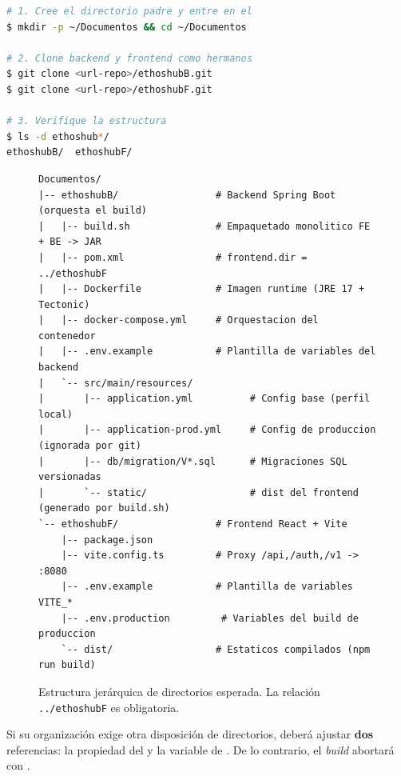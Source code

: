 \begin{lstlisting}[language=bash]
# 1. Cree el directorio padre y entre en el
$ mkdir -p ~/Documentos && cd ~/Documentos

# 2. Clone backend y frontend como hermanos
$ git clone <url-repo>/ethoshubB.git
$ git clone <url-repo>/ethoshubF.git

# 3. Verifique la estructura
$ ls -d ethoshub*/
ethoshubB/  ethoshubF/
\end{lstlisting}

\vspace{0.2cm}
\begin{figure}[h!]
\centering
\begin{lstlisting}[basicstyle=\ttfamily\scriptsize,numbers=none,frame=single,backgroundcolor=\color{grisTecnico}]
Documentos/
|-- ethoshubB/                 # Backend Spring Boot (orquesta el build)
|   |-- build.sh               # Empaquetado monolitico FE + BE -> JAR
|   |-- pom.xml                # frontend.dir = ../ethoshubF
|   |-- Dockerfile             # Imagen runtime (JRE 17 + Tectonic)
|   |-- docker-compose.yml     # Orquestacion del contenedor
|   |-- .env.example           # Plantilla de variables del backend
|   `-- src/main/resources/
|       |-- application.yml          # Config base (perfil local)
|       |-- application-prod.yml     # Config de produccion (ignorada por git)
|       |-- db/migration/V*.sql      # Migraciones SQL versionadas
|       `-- static/                  # dist del frontend (generado por build.sh)
`-- ethoshubF/                 # Frontend React + Vite
    |-- package.json
    |-- vite.config.ts         # Proxy /api,/auth,/v1 -> :8080
    |-- .env.example           # Plantilla de variables VITE_*
    |-- .env.production         # Variables del build de produccion
    `-- dist/                  # Estaticos compilados (npm run build)
\end{lstlisting}
\caption{Estructura jerárquica de directorios esperada. La relación \texttt{../ethoshubF} es obligatoria.}%
\label{fig:arbol}
\end{figure}

\begin{AvisoPrecaucion}
Si su organización exige otra disposición de directorios, deberá ajustar \textbf{dos}
referencias: la propiedad  del  y la variable
 de . De lo contrario, el \textit{build} abortará
con .
\end{AvisoPrecaucion}

